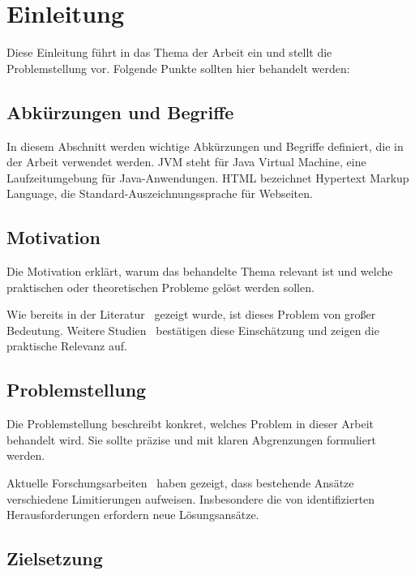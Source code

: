 \chapter{Einleitung}
\label{ch:introduction}

Diese Einleitung führt in das Thema der Arbeit ein und stellt die Problemstellung vor.
Folgende Punkte sollten hier behandelt werden:

\section{Abkürzungen und Begriffe}
\label{sec:abbreviations_and_terms}
In diesem Abschnitt werden wichtige Abkürzungen und Begriffe definiert, die in der Arbeit verwendet werden.
\acl{JVM} steht für Java Virtual Machine, eine Laufzeitumgebung für Java-Anwendungen.
\acs{HTML} bezeichnet Hypertext Markup Language, die Standard-Auszeichnungssprache für Webseiten.

\section{Motivation}
\label{sec:motivation}

Die Motivation erklärt, warum das behandelte Thema relevant ist und welche praktischen oder theoretischen Probleme gelöst werden sollen.

Wie bereits in der Literatur~\cite{example_book} gezeigt wurde, ist dieses Problem von großer Bedeutung.
Weitere Studien~\cite{example_article} bestätigen diese Einschätzung und zeigen die praktische Relevanz auf.

\section{Problemstellung}
\label{sec:problem_statement}

Die Problemstellung beschreibt konkret, welches Problem in dieser Arbeit behandelt wird.
Sie sollte präzise und mit klaren Abgrenzungen formuliert werden.

Aktuelle Forschungsarbeiten~\cite{example_conference} haben gezeigt, dass bestehende Ansätze verschiedene Limitierungen aufweisen.
Insbesondere die von \textcite{example_article} identifizierten Herausforderungen erfordern neue Lösungsansätze.

\section{Zielsetzung}
\label{sec:objectives}


